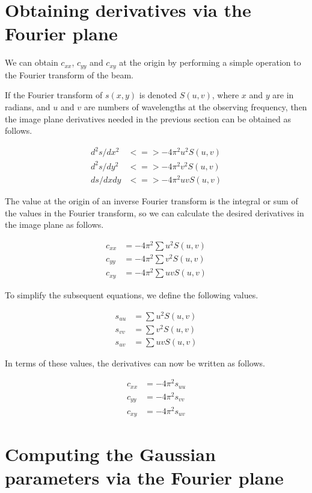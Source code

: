 \documentclass[11pt]{article}
\newcommand{\cxx}{c_{xx}}
\newcommand{\cyy}{c_{yy}}
\newcommand{\cxy}{c_{xy}}
\newcommand{\suu}{s_{uu}}
\newcommand{\svv}{s_{vv}}
\newcommand{\suv}{s_{uv}}
\begin{document}
\section{Obtaining derivatives via the Fourier plane}

We can obtain $\cxx$, $\cyy$ and $\cxy$ at the origin by performing a simple
operation to the Fourier transform of the beam.

If the Fourier transform of $s(x,y)$ is denoted $S(u,v)$, where $x$
and $y$ are in radians, and $u$ and $v$ are numbers of wavelengths at
the observing frequency, then the image plane derivatives needed in
the previous section can be obtained as follows.

\begin{align}
  d^2s/dx^2 &<=> -4\pi^2  u^2  S(u,v)\\
  d^2s/dy^2 &<=> -4\pi^2  v^2  S(u,v)\\
  ds/dxdy &<=> -4\pi^2 u v  S(u,v)
\end{align}

The value at the origin of an inverse Fourier transform is the
integral or sum of the values in the Fourier transform, so we can
calculate the desired derivatives in the image plane as follows.

\begin{align}
  \cxx &= -4 \pi^2  \sum{u^2  S(u,v)} \\
  \cyy &= -4 \pi^2  \sum{v^2  S(u,v)} \\
  \cxy &= -4 \pi^2  \sum{u v  S(u,v)}
\end{align}

To simplify the subsequent equations, we define the following values.

\begin{align}
  \suu &= \sum{u^2  S(u,v)} \\
  \svv &= \sum{v^2  S(u,v)} \\
  \suv &= \sum{u v  S(u,v)}
\end{align}

In terms of these values, the derivatives can now be written as
follows.

\begin{align}
\label{cxx_uv_eqn}
  \cxx &= -4\pi^2  \suu \\
\label{cyy_uv_eqn}
  \cyy &= -4\pi^2  \svv \\
\label{cxy_uv_eqn}
  \cxy &= -4\pi^2  \suv
\end{align}

\section{Computing the Gaussian parameters via the Fourier plane}
\end{document}
